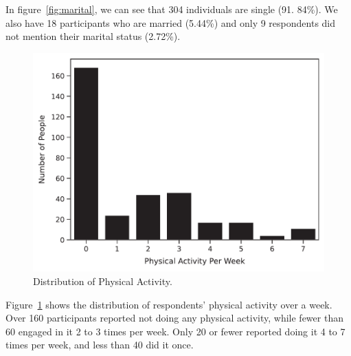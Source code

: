 \documentclass[a4paper,fleqn]{cas-sc}
\begin{document}
In figure~\ref{fig:marital}, we can see that 304 individuals are single (91. 84\%). We also have 18 participants who are married (5.44\%) and only 9 respondents did not mention their marital status (2.72\%). 

\begin{figure}[htb]
  \centering
  \includegraphics[width = \textwidth]{figs/physical_activity.pdf}
  \caption{Distribution of Physical Activity.}
  \label{fig:phy_act}
\end{figure}

Figure~\ref{fig:phy_act} shows the distribution of respondents' physical activity over a week. Over 160 participants reported not doing any physical activity, while fewer than 60 engaged in it 2 to 3 times per week. Only 20 or fewer reported doing it 4 to 7 times per week, and less than 40 did it once.

\end{document}
